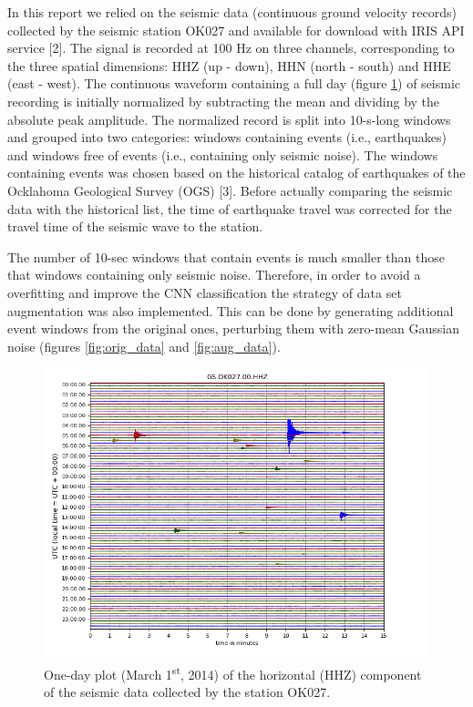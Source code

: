\documentclass{article}
\begin{document}
In this report we relied on the seismic data (continuous ground velocity records) collected by the seismic station OK027 and available for download with IRIS API service [2]. The signal is recorded at 100 Hz on three channels, corresponding to the three spatial dimensions: HHZ (up - down), HHN (north - south) and HHE (east - west). The continuous waveform containing a full day (figure \ref{fig:full_dayl}) of seismic recording is initially normalized by subtracting the mean and dividing by the absolute peak amplitude. The normalized record is split into 10-s-long windows and grouped into two categories: windows containing events (i.e., earthquakes) and windows free of events (i.e., containing only seismic noise). The windows containing events was chosen based on the historical catalog of earthquakes of the Ocklahoma Geological Survey (OGS) [3]. Before actually comparing the seismic data with the historical list, the time of earthquake travel was corrected for the travel time of the seismic wave to the station. 

The number of 10-sec windows that contain events is much smaller than those that windows containing only seismic noise. Therefore, in order to avoid a overfitting and improve the CNN classification the strategy of data set augmentation was also implemented. This can be done by generating additional event windows from the original ones, perturbing them with zero-mean Gaussian noise (figures \ref{fig:orig_data} and \ref{fig:aug_data}). 

\begin{figure}[h!]
    \centering
    \includegraphics[width=0.8\linewidth,height=0.8\linewidth]{images/singlechannel.png}
    \caption{One-day plot (March 1\textsuperscript{st}, 2014) of the horizontal (HHZ) component of the seismic data collected by the station OK027.}
    \label{fig:full_dayl}
\end{figure}
\end{document}

